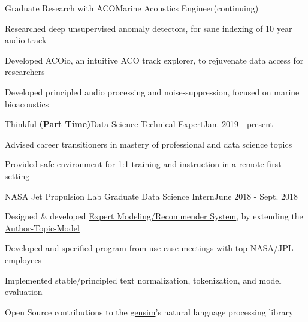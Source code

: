 \documentclass{article}
\newenvironment{**mylist}[2]{
  \subsubsection*{#1\hfill\small#2}
  \small
  \begin{list}{}{}
   \setlength{\topsep}{0pt}
   \setlength{\itemsep}{1pt}
   \setlength{\parskip}{0pt}
   \setlength{\parsep}{0pt}}{\end{list}\normalsize}
\newcommand{\LU}[1]{\hspace{-1em}{\bf Technologies : #1}}
\def\PT{{\bf(Part Time)}\xspace}
\begin{document}
\begin{**mylist}{Graduate Research with ACO\tabb Marine Acoustics Engineer}{(continuing)}
\item Researched deep unsupervised anomaly detectors, for sane indexing of 10 year audio track
\item Developed ACOio, %
  an intuitive ACO track explorer, to rejuvenate data access for researchers
\item Developed principled audio processing and noise-suppression, focused on marine bioacoustics
\item \LU{Python, ACOio, tensorflow, scipy.signal, Jupyter}
\end{**mylist}

\begin{**mylist}{\href{www.thinkful.com}{Thinkful} \PT \tabb Data Science Technical Expert}{Jan. 2019 - present}
\item Advised career transitioners in mastery of professional and data science topics
\item Provided safe environment for 1:1 training and instruction in a remote-first setting
\end{**mylist}


\begin{**mylist}{NASA Jet Propulsion Lab \tabb Graduate Data Science Intern}{June 2018 - Sept. 2018}
\item Designed \& developed \href{https://github.com/probinso/expert-modeling-system}{Expert Modeling/Recommender System}, by extending the \href{https://mimno.infosci.cornell.edu/info6150/readings/398.pdf}{Author-Topic-Model} %
\item Developed and specified program from use-case meetings with top NASA/JPL employees
\item Implemented stable/principled text normalization, tokenization, and model evaluation
\item Open Source contributions to the \href{https://github.com/RaRe-Technologies/gensim}{gensim}'s natural language processing library
\item \LU{Python, nltk, gensim, pyLDAvis, pandas, Jupyter}
\end{**mylist}
\end{document}
